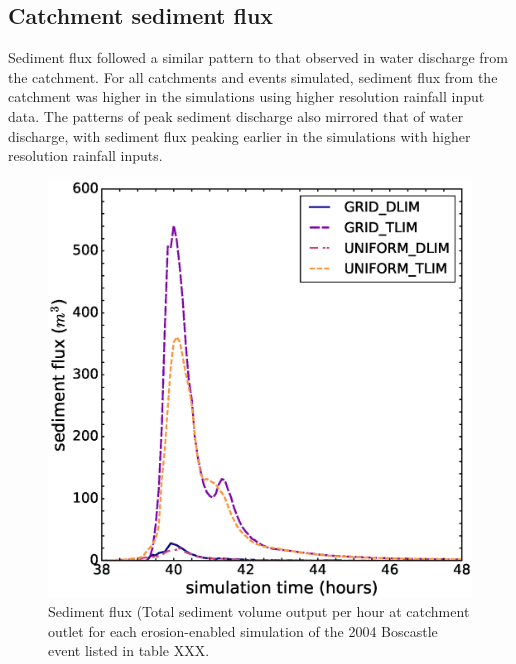 \subsection{Catchment sediment flux}
Sediment flux followed a similar pattern to that observed in water discharge from the catchment. For all catchments and events simulated, sediment flux from the catchment was higher in the simulations using higher resolution rainfall input data. The patterns of peak sediment discharge also mirrored that of water discharge, with sediment flux peaking earlier in the simulations with higher resolution rainfall inputs. 

\begin{figure}[t]
\includegraphics[width=14cm]{chp06_figures_scripts/figure_boscastle_sedigraph_ensemble.eps}
\caption{Sediment flux (Total sediment volume output per hour at catchment outlet for each erosion-enabled simulation of the 2004 Boscastle event listed in table XXX.}
\label{fig_boscastle_sedigraph_ensemble}
\end{figure}

